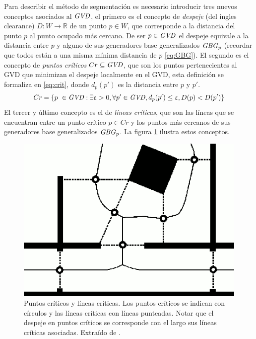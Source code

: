 Para describir el método de segmentación es necesario introducir tres nuevos conceptos asociados al $\mathit{GVD}$, el primero es el concepto de \emph{despeje} (del ingles clearance) $D : W \rightarrow \mathds{R}$ de un punto $p \in W$, que corresponde a la distancia del punto $p$ al punto ocupado más cercano. De ser $p \in \mathit{GVD}$ el despeje equivale a la distancia entre $p$ y alguno de sus generadores base generalizados $\mathit{GBG}_p$ (recordar que todos están a una misma mínima distancia de $p$ \eqref{eq:GBG}). El segundo es el concepto de \emph{puntos críticos} $Cr \subseteq \mathit{GVD}$, que son los puntos pertenecientes al GVD que minimizan el despeje localmente en el GVD, esta definición se formaliza en \eqref{eq:crit}, donde $d_p(p')$ es la distancia entre $p$ y $p'$. 
\begin{equation}
  Cr = \{p\ \in \mathit{GVD} : \exists \upvarepsilon > 0, \forall p' \in \mathit{GVD}, d_p(p') \leq \upvarepsilon, D(p) < D(p') \} \label{eq:crit}
\end{equation}
El tercer y último concepto es el de \emph{líneas críticas}, que son las líneas
que se encuentran entre un punto crítico $p \in Cr$ y los puntos más cercanos de
sus generadores base generalizados $\mathit{GBG}_p$. La figura \ref{fig:crits}
ilustra estos conceptos.

\begin{figure}[H]
  \center
  \includegraphics[width=0.75\linewidth]{imagenes/CritsSharpMono.png}
  \caption[Puntos críticos y líneas críticas.]{Puntos críticos y líneas críticas. Los puntos críticos se indican con círculos y las líneas críticas con líneas punteadas. Notar que el despeje en puntos críticos se corresponde con el largo sus líneas críticas asociadas. Extraído de \cite{Thrun1998}.}\label{fig:crits}
\end{figure} 



